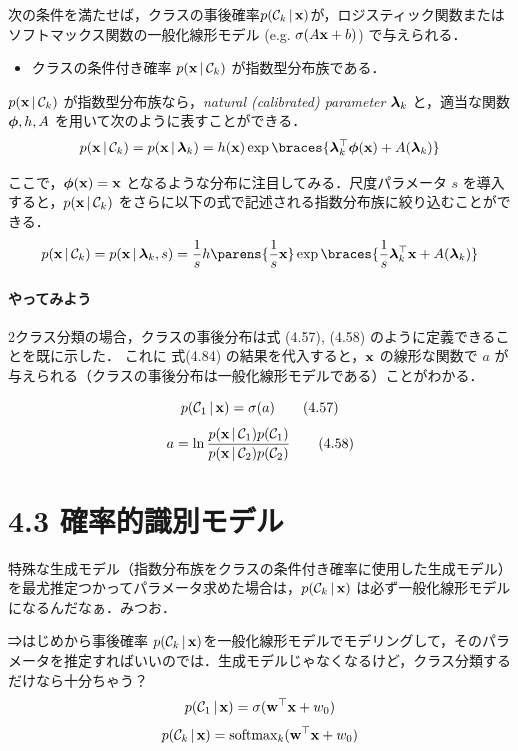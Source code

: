 \begin{embedbox}
次の条件を満たせば，クラスの事後確率$p({\mathcal{C}}_k \,|\, {\mathbf{x}})$が，ロジスティック関数またはソフトマックス関数の一般化線形モデル (e.g. $\sigma(A{\mathbf{x}} + b)$) で与えられる．
\begin{itemize}
  \item クラスの条件付き確率 $p({\mathbf{x}} \,|\, {\mathcal{C}}_k)$ が指数型分布族である．
\end{itemize}
\end{embedbox}

$p({\mathbf{x}} \,|\, {\mathcal{C}}_k)$ が指数型分布族なら，\emph{natural (calibrated) parameter} $\boldsymbol{\lambda}_k$ と，適当な関数 $\boldsymbol{\phi}, h, A$ を用いて次のように表すことができる．
\begin{equation}
  p(\vx \given \cC_k) = p(\vx \given \vlambda_k) = h(\vx) \exp \braces{\vlambda_k\trans \vphi(\vx) + A(\vlambda_k)}
\end{equation}

ここで，$\boldsymbol{\phi}({\mathbf{x}}) = {\mathbf{x}}$ となるような分布に注目してみる．尺度パラメータ $s$ を導入すると，$p({\mathbf{x}} \,|\, {\mathcal{C}}_k)$ をさらに以下の式で記述される指数分布族に絞り込むことができる．
\begin{equation}
  p(\vx \given \cC_k) = p(\vx \given \vlambda_k, s) = \finv{s} h\parens{\finv{s}\vx} \exp \braces{ \finv{s} \vlambda_k\trans \vx  + A(\vlambda_k) }
\end{equation}

\paragraph{やってみよう}
2クラス分類の場合，クラスの事後分布は式 (4.57), (4.58) のように定義できることを既に示した．
これに 式(4.84) の結果を代入すると，${\mathbf{x}}$ の線形な関数で $a$ が与えられる（クラスの事後分布は一般化線形モデルである）ことがわかる．
\begin{embedbox}
  \[
  p({\mathcal{C}}_1\,|\,{\mathbf{x}}) = \sigma(a) \tag{4.57}
  \]
  \[
    a = \ln \frac{p({\mathbf{x}}\,|\,{\mathcal{C}}_{1})p({\mathcal{C}}_{1})}{p({\mathbf{x}}\,|\,{\mathcal{C}}_{2})p({\mathcal{C}}_{2})} \tag{4.58}
  \]
\end{embedbox}

\newpage
\section*{4.3 確率的識別モデル}

特殊な生成モデル（指数分布族をクラスの条件付き確率に使用した生成モデル）を最尤推定つかってパラメータ求めた場合は，$p({\mathcal{C}}_k \,|\, {\mathbf{x}})$ は必ず一般化線形モデルになるんだなぁ．みつお．

⇒はじめから事後確率 $p({\mathcal{C}}_k \,|\, {\mathbf{x}})$を一般化線形モデルでモデリングして，そのパラメータを推定すればいいのでは．生成モデルじゃなくなるけど，クラス分類するだけなら十分ちゃう？
\[
  p({\mathcal{C}}_1 \,|\, {\mathbf{x}}) = \sigma({\mathbf{w}}^\top {\mathbf{x}} + w_0) 
\]
\[
  p({\mathcal{C}}_k \,|\, {\mathbf{x}}) = \mathrm{softmax}_k({\mathbf{w}}^\top {\mathbf{x}} + w_0)
\]

